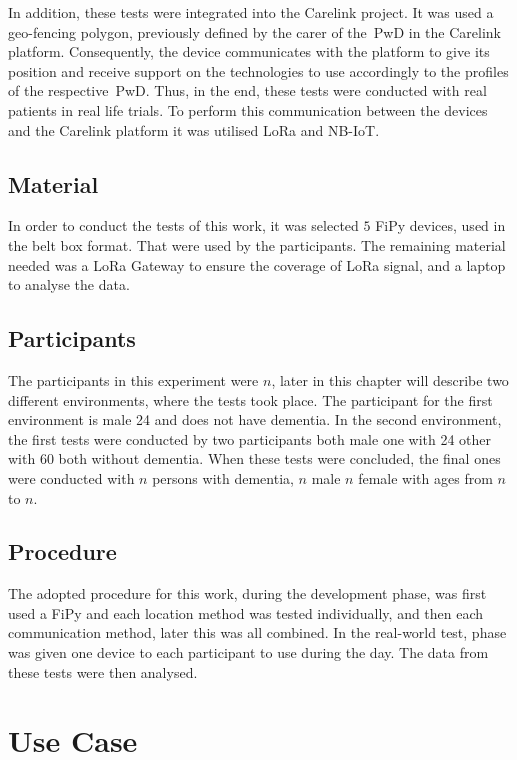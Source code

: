 In addition, these tests were integrated into the Carelink project. It was used a geo-fencing polygon, previously defined by the carer of the~\gls{PwD} in the Carelink platform. Consequently, the device communicates with the platform to give its position and receive support on the technologies to
use accordingly to the profiles of the respective~\gls{PwD}. Thus, in the end, these tests were conducted with real patients in real life trials. To perform this communication between the devices and the Carelink platform it was utilised LoRa and NB-IoT.



\subsection{Material}
\label{subsec:material}
In order to conduct the tests of this work, it was selected $5$ FiPy devices, used in the belt  box format. That were used by the participants. 
The remaining material needed was a LoRa Gateway to ensure the coverage of LoRa signal, and a laptop to analyse the data.



\subsection{Participants}
\label{subsec:Participants}
The participants in this experiment were $n$, later in this chapter will describe two different environments, where the tests took place. The participant for the first environment is male 24 and does not have dementia. In the second environment, the first tests were conducted by two participants both male one with 24 other with 60 both without dementia. When these tests were concluded, the final ones were conducted with $n$ persons with dementia, $n$ male $n$ female with ages from $n$ to $n$.

\subsection{Procedure}
\label{subsec:Procedure}
The adopted procedure for this work, during the development phase, was first used a FiPy and each location method was tested individually, and then each communication method, later this was all combined. In the real-world test, phase was given one device to each participant to use during the day. The data from these tests were then analysed.

\section{Use Case}
\label{sec:Use_case}
